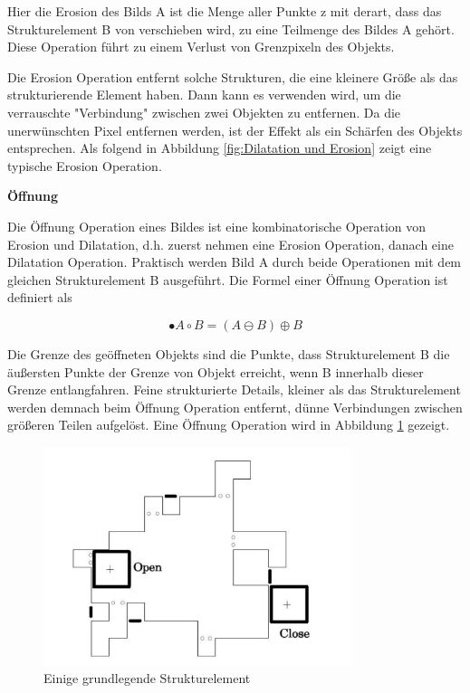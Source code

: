 Hier die Erosion des Bilds A ist die Menge aller Punkte z mit derart, dass das Strukturelement B von verschieben wird, zu eine Teilmenge des Bildes A 	gehört. Diese Operation führt zu einem Verlust von Grenzpixeln des Objekts.

Die Erosion Operation entfernt solche Strukturen, die eine kleinere Größe als das strukturierende Element haben. Dann kann es verwenden wird, um die verrauschte "Verbindung" zwischen zwei Objekten zu entfernen. Da die unerwünschten Pixel entfernen werden, ist der Effekt als ein Schärfen des Objekts entsprechen. Als folgend in Abbildung \ref{fig:Dilatation und Erosion} zeigt eine typische Erosion Operation.


\textbf{Öffnung}

Die Öffnung Operation eines Bildes ist eine kombinatorische Operation von Erosion und Dilatation, d.h. zuerst nehmen eine Erosion Operation, danach eine Dilatation Operation. Praktisch werden Bild A durch beide Operationen mit dem gleichen Strukturelement B ausgeführt. Die Formel einer Öffnung Operation ist definiert als

\begin{equation}
•A \circ B =( A \ominus B )\oplus B  
\end{equation}

Die Grenze des geöffneten Objekts sind die Punkte, dass Strukturelement B die äußersten Punkte der Grenze von Objekt erreicht, wenn B innerhalb dieser Grenze entlangfahren. Feine strukturierte Details,
kleiner als das Strukturelement werden demnach beim Öffnung Operation entfernt, dünne Verbindungen zwischen größeren Teilen aufgelöst. Eine Öffnung Operation wird in Abbildung \ref{fig:oeffnungundschliessung} gezeigt.

\begin{figure}[htb]
 \centering 
  \includegraphics[keepaspectratio,width=0.8\textwidth]{images/4_ZweiteErfahrung/Morphological/oeffnungundschliessung.pdf}
 \caption{Einige grundlegende Strukturelement}
 \label{fig:oeffnungundschliessung}
\end{figure} 

